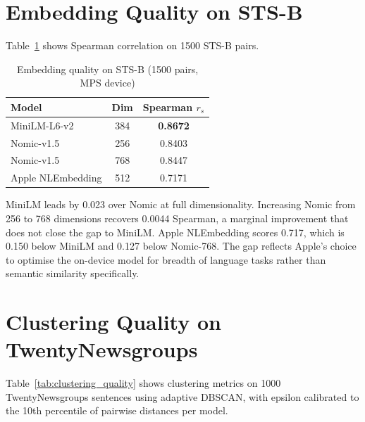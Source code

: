 \section{Embedding Quality on STS-B}

Table~\ref{tab:embedding_quality} shows Spearman correlation on 1500 STS-B pairs.

\begin{table}[h]
\centering
\caption{Embedding quality on STS-B (1500 pairs, MPS device)}
\label{tab:embedding_quality}
\begin{tabular}{|l|c|c|}
\hline
\textbf{Model} & \textbf{Dim} & \textbf{Spearman $r_s$} \\
\hline
MiniLM-L6-v2      & 384 & \textbf{0.8672} \\
Nomic-v1.5        & 256 & 0.8403 \\
Nomic-v1.5        & 768 & 0.8447 \\
Apple NLEmbedding & 512 & 0.7171 \\
\hline
\end{tabular}
\end{table}

MiniLM leads by 0.023 over Nomic at full dimensionality. Increasing Nomic from 256 to 768 dimensions recovers 0.0044 Spearman, a marginal improvement that does not close the gap to MiniLM. Apple NLEmbedding scores 0.717, which is 0.150 below MiniLM and 0.127 below Nomic-768. The gap reflects Apple's choice to optimise the on-device model for breadth of language tasks rather than semantic similarity specifically.

\section{Clustering Quality on TwentyNewsgroups}

Table~\ref{tab:clustering_quality} shows clustering metrics on 1000 TwentyNewsgroups sentences using adaptive DBSCAN, with epsilon calibrated to the 10th percentile of pairwise distances per model.

\begin{table}[h]
\centering
\caption{Clustering quality on TwentyNewsgroupsClustering (1000 sentences, adaptive DBSCAN)}
\label{tab:clustering_quality}
\end{table}

